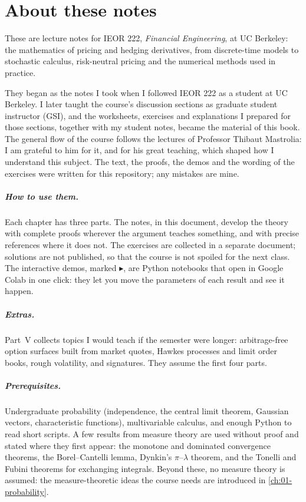 \chapter*{About these notes}

These are lecture notes for IEOR 222, \emph{Financial Engineering}, at UC Berkeley: the
mathematics of pricing and hedging derivatives, from discrete-time models to stochastic
calculus, risk-neutral pricing and the numerical methods used in practice.

They began as the notes I took when I followed IEOR 222 as a student at UC Berkeley. I
later taught the course's discussion sections as graduate student instructor (GSI), and the
worksheets, exercises and explanations I prepared for those sections, together with my
student notes, became the material of this book. The general flow of the course follows
the lectures of Professor Thibaut Mastrolia: I am grateful to him for it, and for his
great teaching, which shaped how I understand this subject. The text, the proofs, the
demos and the wording of the exercises were written for this repository; any mistakes
are mine.

\paragraph{How to use them.} Each chapter has three parts. The notes, in this document,
develop the theory with complete proofs wherever the argument teaches something, and
with precise references where it does not. The exercises are collected in a separate
document; solutions are not published, so that the course is not spoiled for the next
class. The interactive demos, marked \textcolor{cobalt}{$\blacktriangleright$}, are Python
notebooks that open in Google Colab in one click: they let you move the parameters of
each result and see it happen.

\paragraph{Extras.} Part~V collects topics I would teach if the semester were longer:
arbitrage-free option surfaces built from market quotes, Hawkes processes and limit order
books, rough volatility, and signatures. They assume the first four parts.

\paragraph{Prerequisites.} Undergraduate probability (independence, the central limit
theorem, Gaussian vectors, characteristic functions), multivariable calculus, and enough
Python to read short scripts. A few results from measure theory are used without proof
and stated where they first appear: the monotone and dominated convergence theorems, the
Borel--Cantelli lemma, Dynkin's $\pi$--$\lambda$ theorem, and the Tonelli and Fubini
theorems for exchanging integrals. Beyond these, no measure theory is assumed: the
measure-theoretic ideas the course needs are introduced in \cref{ch:01-probability}.

